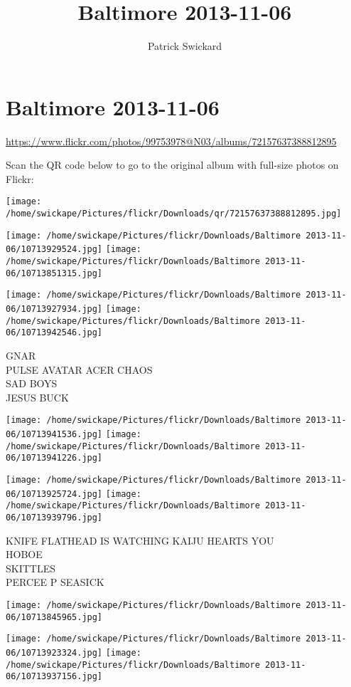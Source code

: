 \documentclass[10pt,letterpaper]{article}
\title{Baltimore 2013-11-06}
\author{Patrick Swickard}
\date{}
\begin{document}
\section*{Baltimore 2013-11-06}

\url{https://www.flickr.com/photos/99753978@N03/albums/72157637388812895}

Scan the QR code below to go to the original album with full-size photos on Flickr:

\texttt{[image: /home/swickape/Pictures/flickr/Downloads/qr/72157637388812895.jpg]}
\pagebreak

\texttt{[image: /home/swickape/Pictures/flickr/Downloads/Baltimore 2013-11-06/10713929524.jpg]}
\texttt{[image: /home/swickape/Pictures/flickr/Downloads/Baltimore 2013-11-06/10713851315.jpg]}

\texttt{[image: /home/swickape/Pictures/flickr/Downloads/Baltimore 2013-11-06/10713927934.jpg]}
\texttt{[image: /home/swickape/Pictures/flickr/Downloads/Baltimore 2013-11-06/10713942546.jpg]}

GNAR\\
PULSE AVATAR ACER CHAOS\\
SAD BOYS\\
JESUS BUCK
\pagebreak

\texttt{[image: /home/swickape/Pictures/flickr/Downloads/Baltimore 2013-11-06/10713941536.jpg]}
\texttt{[image: /home/swickape/Pictures/flickr/Downloads/Baltimore 2013-11-06/10713941226.jpg]}

\texttt{[image: /home/swickape/Pictures/flickr/Downloads/Baltimore 2013-11-06/10713925724.jpg]}
\texttt{[image: /home/swickape/Pictures/flickr/Downloads/Baltimore 2013-11-06/10713939796.jpg]}

KNIFE FLATHEAD IS WATCHING KAIJU HEARTS YOU\\
HOBOE\\
SKITTLES\\
PERCEE P SEASICK
\pagebreak

\texttt{[image: /home/swickape/Pictures/flickr/Downloads/Baltimore 2013-11-06/10713845965.jpg]}

\vspace{0.25in}
\texttt{[image: /home/swickape/Pictures/flickr/Downloads/Baltimore 2013-11-06/10713923324.jpg]}
\texttt{[image: /home/swickape/Pictures/flickr/Downloads/Baltimore 2013-11-06/10713937156.jpg]}
\end{document}
